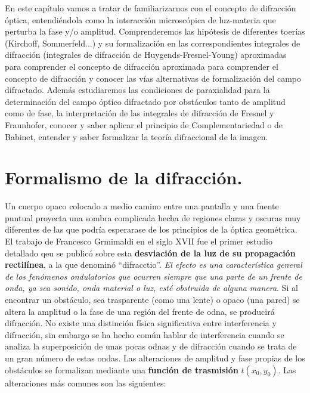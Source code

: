 \documentclass[12pt,a4paper]{book}
\numberwithin{equation}{section}
\numberwithin{figure}{section}
\newcommand{\1}{_{(1)}}
\newcommand{\2}{_{(2)}}
\theoremstyle{definition}
\begin{document}
En este capítulo vamos a tratar de familiarizarnos con el concepto de difracción óptica,  entendiéndola como la interacción microscópica de luz-materia que perturba la fase y/o amplitud. Comprenderemos las hipótesis de diferentes toerías (Kirchoff, Sommerfeld...) y su formalización en las correspondientes integrales de difracción (integrales de difracción de Huygends-Fresnel-Young) aproximadas para comprender el concepto de difracción aproximada para comprender el concepto de difracción y conocer las vías alternativas de formalización del campo difractado. Además estudiaremos las condiciones de paraxialidad para la determinación del campo óptico difractado por obstáculos tanto de amplitud como de fase, la interpretación de las integrales de difracción de Fresnel y Fraunhofer, conocer y saber aplicar el principio de Complementariedad o de Babinet, entender y saber formalizar la teoría difraccional de la imagen. 

\section{Formalismo de la difracción.}

Un cuerpo opaco colocado a medio camino entre una pantalla y una fuente puntual proyecta una sombra complicada hecha de regiones claras y oscuras muy diferentes de las que podría esperarase de los principios de la óptica geométrica. El trabajo de Francesco Grmimaldi en el siglo XVII fue el primer estudio detallado qeu se publicó sobre esta \textbf{desviación de la luz de su propagación rectilínea}, a la que denominó ``difracctio''. \textit{El efecto es una característica general de los fenómenos ondulatorios que ocurren siempre que una parte de un frente de onda, ya sea sonido, onda material o luz, esté obstruida de alguna manera}. Si al encontrar un obstáculo, sea trasparente (como una lente) o opaco (una pared) se altera la amplitud o la fase de una región del frente de odna, se producirá difracción. No existe una distinción física significativa entre interferencia y difracción, sin embargo se ha hecho común hablar de interferencia cuando se analiza la superposición de unas pocas odnas y de difracción cuando se trata de un gran número de estas ondas. Las alteraciones de amplitud y fase propias de los obstáculos se formalizan mediante una \textbf{función de trasmisión} $t(x_0,y_0)$. Las alteraciones más comunes son las siguientes: \\
\end{document}
